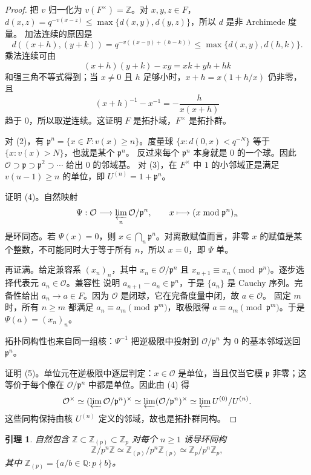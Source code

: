 \documentclass[11pt,a4paper,openany]{ctexbook}
\numberwithin{equation}{chapter}
\newcommand{\Q}{\mathbb{Q}}
\newcommand{\Z}{\mathbb{Z}}
\theoremstyle{plain}
\newtheorem{lemma}[theorem]{引理}
\theoremstyle{definition}
\theoremstyle{remark}
\begin{document}
\begin{proof}
把 $v$ 归一化为 $v(F^\times)=\Z$。对 $x,y,z\in F$，
$d(x,z)=q^{-v(x-z)}\le\max\{d(x,y),d(y,z)\}$，所以 $d$ 是非 Archimede 度量。
加法连续的原因是
\[
d((x+h),(y+k))=q^{-v((x-y)+(h-k))}
\le \max\{d(x,y),d(h,k)\}.
\]
乘法连续可由
\[
(x+h)(y+k)-xy=xk+yh+hk
\]
和强三角不等式得到；当 $x\ne0$ 且 $h$ 足够小时，$x+h=x(1+h/x)$ 仍非零，且
\[
(x+h)^{-1}-x^{-1}=-\frac{h}{x(x+h)}
\]
趋于 $0$，所以取逆连续。这证明 $F$ 是拓扑域，$F^\times$ 是拓扑群。

对 (2)，有 $\mathfrak p^n=\{x\in F:v(x)\ge n\}$。度量球
$\{x:d(0,x)<q^{-N}\}$ 等于 $\{x:v(x)>N\}$，也就是某个 $\mathfrak p^n$。
反过来每个 $\mathfrak p^n$ 本身就是 $0$ 的一个球。因此
$\mathcal O\supset\mathfrak p\supset\mathfrak p^2\supset\cdots$ 给出 $0$ 的邻域基。
对 (3)，在 $F^\times$ 中 $1$ 的小邻域正是满足 $v(u-1)\ge n$ 的单位，即
$U^{(n)}=1+\mathfrak p^n$。

证明 (4)。自然映射
\[
\Psi:\mathcal O\longrightarrow\varprojlim_n\mathcal O/\mathfrak p^n,\qquad
x\longmapsto (x\bmod\mathfrak p^n)_n
\]
是环同态。若 $\Psi(x)=0$，则 $x\in\bigcap_n\mathfrak p^n$。对离散赋值而言，非零
$x$ 的赋值是某个整数，不可能同时大于等于所有 $n$，所以 $x=0$，即 $\Psi$ 单。

再证满。给定兼容系 $(x_n)_n$，其中 $x_n\in\mathcal O/\mathfrak p^n$ 且
$x_{n+1}\equiv x_n\pmod{\mathfrak p^n}$。逐步选择代表元 $a_n\in\mathcal O$。兼容性
说明 $a_{n+1}-a_n\in\mathfrak p^n$，于是 $\{a_n\}$ 是 Cauchy 序列。完备性给出
$a_n\to a\in F$。因为 $\mathcal O$ 是闭球，它在完备度量中闭，故 $a\in\mathcal O$。
固定 $m$ 时，所有 $n\ge m$ 都满足 $a_n\equiv a_m\pmod{\mathfrak p^m}$，取极限得
$a\equiv a_m\pmod{\mathfrak p^m}$。于是 $\Psi(a)=(x_n)_n$。

拓扑同构性也来自同一组核：$\Psi^{-1}$ 把逆极限中投射到
$\mathcal O/\mathfrak p^n$ 为 $0$ 的基本邻域送回 $\mathfrak p^n$。

证明 (5)。单位元在逆极限中逐层判定：$x\in\mathcal O$ 是单位，当且仅当它模
$\mathfrak p$ 非零；这等价于每个像在 $\mathcal O/\mathfrak p^n$ 中都是单位。因此由
(4) 得
\[
\mathcal O^\times\simeq(\varprojlim\mathcal O/\mathfrak p^n)^\times
\simeq\varprojlim(\mathcal O/\mathfrak p^n)^\times
\simeq\varprojlim U^{(0)}/U^{(n)}.
\]
这些同构保持由核 $U^{(n)}$ 定义的邻域，故也是拓扑群同构。
\end{proof}

\begin{lemma}
自然包含 $\Z\subset\Z_{(p)}\subset\Z_p$ 对每个 $n\ge1$ 诱导环同构
\[
\Z/p^n\Z\simeq \Z_{(p)}/p^n\Z_{(p)}\simeq \Z_p/p^n\Z_p,
\]
其中 $\Z_{(p)}=\{a/b\in\Q:p\nmid b\}$。
\end{lemma}
\end{document}
